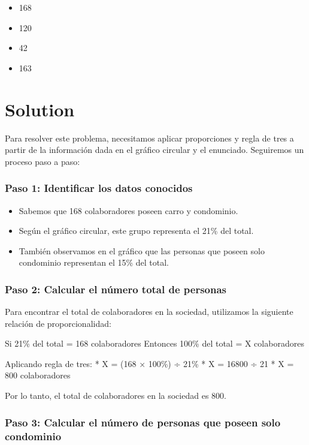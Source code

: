 \documentclass[
]{article}
\providecommand{\tightlist}{%
  \setlength{\itemsep}{0pt}\setlength{\parskip}{0pt}}
\begin{document}
\begin{itemize}
\tightlist
\item
  168
\item
  120
\item
  42
\item
  163
\end{itemize}

\section{Solution}\label{solution}

Para resolver este problema, necesitamos aplicar proporciones y regla de
tres a partir de la información dada en el gráfico circular y el
enunciado. Seguiremos un proceso paso a paso:

\subsubsection{Paso 1: Identificar los datos
conocidos}\label{paso-1-identificar-los-datos-conocidos}

\begin{itemize}
\tightlist
\item
  Sabemos que 168 colaboradores poseen carro y condominio.
\item
  Según el gráfico circular, este grupo representa el 21\% del total.
\item
  También observamos en el gráfico que las personas que poseen solo
  condominio representan el 15\% del total.
\end{itemize}

\subsubsection{Paso 2: Calcular el número total de
personas}\label{paso-2-calcular-el-nuxfamero-total-de-personas}

Para encontrar el total de colaboradores en la sociedad, utilizamos la
siguiente relación de proporcionalidad:

Si 21\% del total = 168 colaboradores Entonces 100\% del total = X
colaboradores

Aplicando regla de tres: * X = (168 × 100\%) ÷ 21\% * X = 16800 ÷ 21 * X
= 800 colaboradores

Por lo tanto, el total de colaboradores en la sociedad es 800.

\subsubsection{Paso 3: Calcular el número de personas que poseen solo
condominio}\label{paso-3-calcular-el-nuxfamero-de-personas-que-poseen-solo-condominio}
\end{document}
